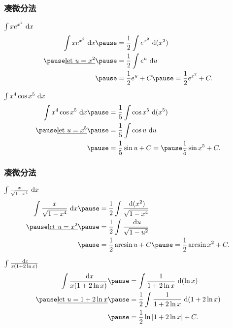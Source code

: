 \documentclass[
10pt,
aspectratio=43,
]{beamer}
\begin{document}
\begin{frame}
	\frametitle{凑微分法}
	\everymath{\displaystyle}
	{\small
		\begin{exampleblock}{$\color{black}\int x e^{x^2} \mathrm{~d}x$}
			$$
				\begin{aligned}
					\int x e^{x^2} \mathrm{~d}x        & \pause= \frac{1}{2} \int e^{x^2} \mathrm{~d}(x^2)        \\
					\pause\underline{\text{let }u=x^2} & \pause=  \frac{1}{2} \int e^u \mathrm{~d}u               \\
					                                   & \pause= \frac{1}{2} e^u+C \pause= \frac{1}{2} e^{x^2}+C.
				\end{aligned}
			$$
		\end{exampleblock}
		\pause
		\begin{exampleblock}{$\color{black}\int x^4 \cos x^5 \mathrm{~d}x$}
			$$
				\begin{aligned}
					\int x^4 \cos x^5 \mathrm{~d}x     & \pause = \frac{1}{5} \int \cos x^5 \mathrm{~d}(x^5)           \\
					\pause\underline{\text{let }u=x^5} & \pause =  \frac{1}{5} \int \cos u \mathrm{~d}u                \\
					                                   & \pause = \frac{1}{5} \sin u+C =\pause \frac{1}{5} \sin x^5+C.
				\end{aligned}
			$$
		\end{exampleblock}
	}
\end{frame}


\begin{frame}
	\frametitle{凑微分法}
	\everymath{\displaystyle}
	{\small
		\begin{exampleblock}{$\color{black}\int \frac{x}{\sqrt{1-x^4}} \mathrm{~d}x$}
			$$
				\begin{aligned}
					\int \frac{x}{\sqrt{1-x^4}} \mathrm{~d}x & \pause= \frac{1}{2} \int \frac{\mathrm{~d}(x^2)}{\sqrt{1-x^4}}     \\
					\pause\underline{\text{let }u=x^2}       & \pause=  \frac{1}{2} \int \frac{\mathrm{~d}u}{\sqrt{1-u^2}}        \\
					                                         & \pause= \frac{1}{2} \arcsin u+C \pause= \frac{1}{2} \arcsin x^2+C.
				\end{aligned}
			$$
		\end{exampleblock}
		\pause
		\begin{exampleblock}{$\color{black}\int \frac{\mathrm{~d}x}{x(1+2 \ln x)}$}
			$$
				\begin{aligned}
					\int \frac{\mathrm{~d}x}{x(1+2 \ln x)}   & \pause= \int \frac{1}{1+2 \ln x} \mathrm{~d}(\ln x)                  \\
					\pause\underline{\text{let }u=1+2 \ln x} & \pause=  \frac{1}{2} \int \frac{1}{1+2 \ln x} \mathrm{~d}(1+2 \ln x) \\
					                                         & \pause= \frac{1}{2} \ln |1+2 \ln x|+C.
				\end{aligned}
			$$
		\end{exampleblock}
	}
\end{frame}
\end{document}
